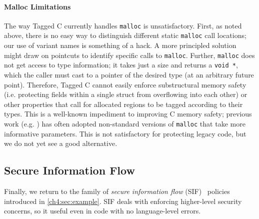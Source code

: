 \paragraph*{Malloc Limitations}
\label{ch4:sec:limitations}

The way Tagged C currently handles {\tt malloc} is unsatisfactory. First, as noted above, there is no
easy way to distinguish different static {\tt malloc} call locations; our use of
variant names is something of a hack.
A more principled solution might draw on pointcuts to identify specific calls to {\tt malloc}.
Further, {\tt malloc} does not get access to type information;
it takes just a size and returns a {\tt void *}, which the caller must
cast to a pointer of the desired type (at an arbitrary future point).
Therefore, Tagged C cannot easily
enforce substructural memory safety (i.e. protecting fields within a single struct
from overflowing into each other) or other properties that call for allocated
regions to be tagged according to their types.
This is a well-known impediment to improving C memory safety;
previous work  (e.g. \cite{Michael23:MSWASM}) has often adopted non-standard
versions of {\tt malloc} that take more informative parameters. This is
not satisfactory for protecting legacy code, but we do not yet see a good alternative.

\subsection{Secure Information Flow}
\label{ch4:sec:SIF}

Finally, we return to the family of 
{\em secure information flow} (SIF)~\cite{Denning77:SecureInformationFlow} policies
introduced in \cref{ch4:sec:example}. 
SIF deals with enforcing higher-level security concerns, so it useful even in code with no language-level errors.

